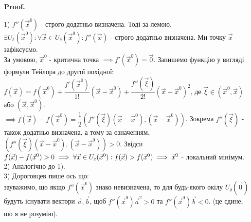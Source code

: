 \documentclass[a4paper, 10pt]{article}
\makeatletter
\def\qed{$\blacksquare$}
\theoremstyle{theoremdd}
\theoremstyle{theoremdd}
\theoremstyle{theoremdd}
\theoremstyle{theoremdd}
\theoremstyle{theoremdd}
\theoremstyle{theoremdd}
\theoremstyle{theoremdd}
\theoremstyle{theoremdd}
\theoremstyle{theoremdd}
\renewenvironment{proof}[1][Proof.\\]{\par
\pushQED{\hfill \qed}%
\normalfont \topsep6\p@\@plus6\p@\relax
\trivlist
\item\relax
{\bfseries
#1\@addpunct{.}}\hspace\labelsep\ignorespaces
}{%
\popQED\endtrivlist\@endpefalse
}
\makeatother
\begin{document}
\begin{proof}
1) $f''(\vec{x}^0)$ - строго додатньо визначена. Тоді за лемою, $\exists U_{\delta}(\vec{x}^0): \forall \vec{x} \in U_{\delta}(\vec{x}^0): f''(\vec{x})$ - строго додатньо визначена. Ми точку $\vec{x}$ зафіксуємо.\\
За умовою, $\vec{x}^0$ - критична точка $\implies f'(\vec{x}^0) = \vec{0}$. Запишемо функцію у вигляді формули Тейлора до другої похідної:\\
$f(\vec{x}) = f(\vec{x}^0) + \dfrac{f'(\vec{x}^0)}{1!}(\vec{x}-\vec{x}^0) + \dfrac{f''(\vec{\xi})}{2!}(\vec{x}-\vec{x}^0)^2$, де $\vec{\xi} \in (\vec{x}^0,\vec{x})$ або $(\vec{x},\vec{x}^0)$.\\
$\implies f(\vec{x}) - f(\vec{x}^0) = \dfrac{1}{2} \left(f''(\vec{\xi})(\vec{x}-\vec{x}^0), (\vec{x}-\vec{x}^0) \right)$. Зокрема $f''(\vec{\xi})$ - також додатньо визначена, а тому за означенням, $\left( f''(\vec{\xi})(\vec{x}-\vec{x}^0),(\vec{x}-\vec{x}^0) \right) > 0$. Звідси $f(\vec{x})-f(\vec{x}^0) > 0 \\ \implies \forall \vec{x} \in U_{\varepsilon}(\vec{x}^0): f(\vec{x}) > f(\vec{x}^0) \implies \vec{x}^0$ - локальний мінімум.
\bigskip \\

2) Аналогічно до 1).
\bigskip \\

3) Дороговцев пише ось що:\\
зауважимо, що якщо $f''(\vec{x}^0)$ знако невизначена, то для будь-якого окілу $U_\delta (\vec{0})$ будуть існувати вектори $\vec{a}, \vec{b}$, щоб $f''(\vec{x}^0) \vec{a}^2 > 0$ та $f''(\vec{x}^0) \vec{b} < 0$. (це єдине, шо я не розумію).
\iffalse
$f''(\vec{x}^0)$ - знако-невизначена. Тоді за наслідком леми, $\exists U_\delta (\vec{x}^0): \forall \vec{x} \in U_\delta (\vec{x}^0): f''(\vec{x})$ - знако-невизначена.\\
Маємо $f(\vec{x}) - f(\vec{x}^0) = \dfrac{1}{2} \left(f''(\vec{\xi})(\vec{x}-\vec{x}^0), (\vec{x}-\vec{x}^0) \right)$, $\vec{\xi} \in (\vec{x}^0,\vec{x})$ або $(\vec{x},\vec{x}^0)$. \\ Зокрема в точці $\vec{\xi}$ матриця $f''(\vec{\xi})$ - знако-невизначена. За означенням
Тоді за попередними пунктами, $f(\vec{x}^0) < f(\vec{x}_1)$ та $f(\vec{x}^0) > f(\vec{x}_2)$, що порушують означення локального екстремуму для точки $\vec{x}^0$
\fi
\end{proof}
\fi
\end{document}

